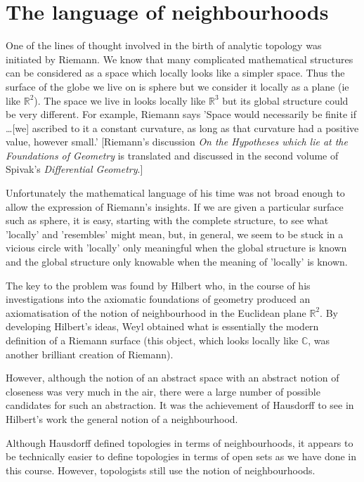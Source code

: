 \section{The language of neighbourhoods}
One of the lines of thought involved in the birth 
of analytic topology was initiated by Riemann.
We know that many complicated mathematical structures
can be considered as a space which locally looks like a simpler
space. Thus the surface of the globe we live on is sphere 
but we consider it locally as a plane (ie like ${\mathbb R}^{2}$).
The space we live in looks locally like ${\mathbb R}^{3}$
but its global structure could be very different.
For example, Riemann says 'Space would necessarily be
finite if \dots [we] ascribed to it a constant curvature,
as long as that curvature had a positive value, however small.'
[Riemann's discussion 
\emph{On the Hypotheses which lie at the Foundations of Geometry}
is translated and discussed in the second volume of Spivak's
\emph{Differential Geometry}.]

Unfortunately the mathematical language of his time 
was not broad enough to allow the expression of
Riemann's insights. If we are given a particular
surface such as sphere, it is easy, starting with
the complete structure, to see what 'locally'
and 'resembles' might mean, but, in general, we seem to be stuck
in a vicious circle with 'locally' only meaningful
when the global structure is known and the global structure
only knowable when the meaning of 'locally' is known.

The key to the problem was found by Hilbert who,
in the course of his investigations into the axiomatic 
foundations of geometry produced an axiomatisation of
the notion of neighbourhood in the Euclidean plane
${\mathbb R}^{2}$. By developing Hilbert's ideas,
Weyl obtained what is essentially the modern definition
of a Riemann surface (this object, which looks locally like
${\mathbb C}$, was another brilliant creation of Riemann).

However, although the notion of an abstract space with 
an abstract notion of closeness was very much in the air,
there were a large number of possible candidates
for such an abstraction. It was the achievement
of Hausdorff to see in Hilbert's work the general notion
of a neighbourhood. 

Although Hausdorff defined topologies in terms of neighbourhoods,
it appears to be technically easier to define 
topologies in terms of open sets as we have done in this course.
However, topologists still use the notion of neighbourhoods.

